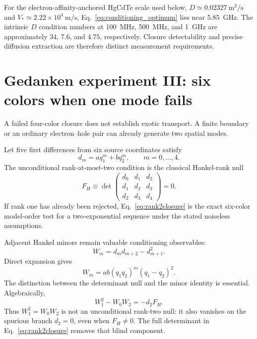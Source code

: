 \documentclass[11pt]{article}
\begin{document}
For the electron-affinity-anchored HgCdTe scale used below, $D\simeq0.02327~\mathrm{m^2/s}$ and $V_*\simeq2.22\times10^4~\mathrm{m/s}$, Eq.~\eqref{eq:conditioning_optimum} lies near \SI{5.85}{GHz}. The intrinsic $D$ condition numbers at \SI{100}{MHz}, \SI{500}{MHz}, and \SI{1}{GHz} are approximately $34$, $7.6$, and $4.75$, respectively. Closure detectability and precise diffusion extraction are therefore distinct measurement requirements.

\section{Gedanken experiment III: six colors when one mode fails}

A failed four-color closure does not establish exotic transport. A finite boundary or an ordinary electron--hole pair can already generate two spatial modes.

Let five first differences from six source coordinates satisfy
\begin{equation}
d_m=a q_1^m+b q_2^m,
\qquad m=0,\ldots,4.
\label{eq:twomode}
\end{equation}
The unconditional rank-at-most-two condition is the classical Hankel-rank null
\begin{equation}
\boxed{
F_H\equiv
\det
\begin{pmatrix}
d_0&d_1&d_2\\
d_1&d_2&d_3\\
d_2&d_3&d_4
\end{pmatrix}=0.}
\label{eq:rank2closure}
\end{equation}
If rank one has already been rejected, Eq.~\eqref{eq:rank2closure} is the exact six-color model-order test for a two-exponential sequence under the stated noiseless assumptions.

Adjacent Hankel minors remain valuable conditioning observables:
\begin{equation}
W_m=d_md_{m+2}-d_{m+1}^2.
\end{equation}
Direct expansion gives
\begin{equation}
\boxed{W_m=ab(q_1q_2)^m(q_1-q_2)^2.}
\label{eq:Widentity}
\end{equation}
The distinction between the determinant null and the minor identity is essential. Algebraically,
\begin{equation}
\boxed{W_1^2-W_0W_2=-d_2F_H.}
\label{eq:minor_factorization}
\end{equation}
Thus $W_1^2=W_0W_2$ is not an unconditional rank-two null: it also vanishes on the spurious branch $d_2=0$, even when $F_H\neq0$. The full determinant in Eq.~\eqref{eq:rank2closure} removes that blind component.
\end{document}
